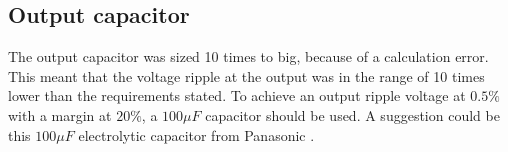 \subsection{Output capacitor} \label{output_cap_discussion}	
The output capacitor was sized 10 times to big, because of a calculation error. This meant that the voltage ripple at the output was in the range of 10 times lower than the requirements stated. To achieve an output ripple voltage at $0.5\%$ with a margin at $20\%$, a $100\mu F$ capacitor should be used. A suggestion could be this $100 \mu F$ electrolytic capacitor from Panasonic \cite{new_out_cap_datasheet}.